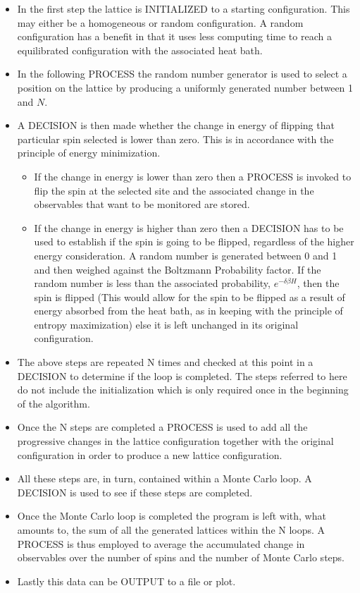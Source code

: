 \documentclass[a4paper]{article}
\begin{document}
\begin{itemize}
\item{In the first step the lattice is INITIALIZED to a
    starting configuration. This may either be a homogeneous or random 
    configuration. A random configuration has a benefit in that it
    uses less 
    computing time to reach a equilibrated configuration with the
    associated heat bath.}
\item{In the following PROCESS the random number generator is used to
    select a position on the lattice by producing a uniformly
    generated number between 1 and $N$.}%
\item{A DECISION is then made whether the change in energy of
    flipping that particular spin selected is lower than zero. This is 
    in accordance with the principle of energy minimization.}
  \begin{itemize}
  \item{If the change in energy is lower than zero then a PROCESS is
      invoked to flip the spin at the selected site and the associated 
      change in
      the observables that want to be monitored are stored.}
  \item{If the change in energy is higher than zero then a DECISION
      has to be used to establish if the spin is going to be flipped,
      regardless of the higher energy consideration. A random number
      is generated between 0 and 1 and then weighed against the
      Boltzmann Probability factor. If the random number is less than
      the associated probability, $e^{-\delta \beta H}$, then the spin
      is flipped (This would allow for the spin to be flipped as a
      result of energy absorbed from the heat bath, as in keeping
      with the principle of entropy maximization) else it is left
      unchanged in its original configuration.}  
  \end{itemize} 
\item{The above steps are repeated N times and checked at this point in a DECISION
    to determine if the loop is completed. The steps referred to here
    do not include the initialization which is only required once in
    the beginning of the algorithm.} %
\item{Once the N steps are completed a PROCESS is used to add all the
    progressive changes in 
    the lattice configuration together with the original
    configuration in order to produce a new lattice configuration.}  
\item{All these steps are, in turn, contained within a Monte
    Carlo loop. A DECISION is used to see if these steps are
    completed.} %
\item{Once the Monte Carlo loop is completed the program is left with, 
    what amounts to, the sum of all the generated lattices within the
    N loops. A PROCESS is thus employed to average the accumulated
    change in observables over the number of spins and the number of
    Monte Carlo steps.}
\item{Lastly this data can be OUTPUT to a file or plot.} 
\end{itemize}
\end{document}
